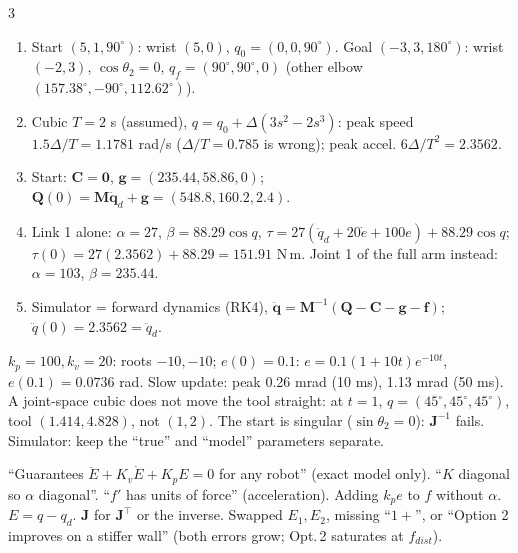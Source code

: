 \begin{multicols}{3}
\begin{recipe}
\label{w9:prac}
\begin{enumerate}
\item Start $(5,1,90^\circ)$: wrist $(5,0)$, $q_0=(0,0,90^\circ)$. Goal $(-3,3,180^\circ)$: wrist $(-2,3)$, $\cos\theta_2=0$, $q_f=(90^\circ,90^\circ,0)$ (other elbow $(157.38^\circ,-90^\circ,112.62^\circ)$).
\item Cubic $T=2$ s (assumed), $q=q_0+\Delta(3s^2-2s^3)$: peak speed $1.5\Delta/T=1.1781$ rad/s ($\Delta/T=0.785$ is wrong); peak accel. $6\Delta/T^2=2.3562$.
\item Start: $\mathbf C=\mathbf 0$, $\mathbf g=(235.44,58.86,0)$; $\mathbf Q(0)=\mathbf M\ddot{\mathbf q}_d+\mathbf g=(548.8,160.2,2.4)$.
\item Link 1 alone: $\alpha=27$, $\beta=88.29\cos q$, $\tau=27(\ddot q_d{+}20\dot e{+}100e)+88.29\cos q$; $\tau(0)=27(2.3562)+88.29=151.91$ N\,m. Joint 1 of the full arm instead: $\alpha=103$, $\beta=235.44$.
\item Simulator = forward dynamics (RK4), $\ddot{\mathbf q}=\mathbf M^{-1}(\mathbf Q-\mathbf C-\mathbf g-\mathbf f)$; $\ddot q(0)=2.3562=\ddot q_d$.
\end{enumerate}
\end{recipe}
$k_p{=}100,k_v{=}20$: roots $-10,-10$; $e(0)=0.1$: $e=0.1(1+10t)e^{-10t}$, $e(0.1)=0.0736$ rad. Slow update: peak 0.26 mrad (10 ms), 1.13 mrad (50 ms). A joint-space cubic does not move the tool straight: at $t=1$, $q=(45^\circ,45^\circ,45^\circ)$, tool $(1.414,4.828)$, not $(1,2)$. The start is singular ($\sin\theta_2=0$): $\mathbf J^{-1}$ fails. Simulator: keep the ``true'' and ``model'' parameters separate. \chk
\begin{trap}
``Guarantees $\ddot E+K_v\dot E+K_pE=0$ for any robot'' (exact model only). ``$K$ diagonal so $\alpha$ diagonal''. ``$f'$ has units of force'' (acceleration). Adding $k_pe$ to $f$ without $\alpha$. $E=q-q_d$. $\mathbf J$ for $\mathbf J^\top$ or the inverse. Swapped $E_1,E_2$, missing ``$1+$'', or ``Option 2 improves on a stiffer wall'' (both errors grow; Opt.\,2 saturates at $f_{dist}$).
\end{trap}
\end{multicols}
